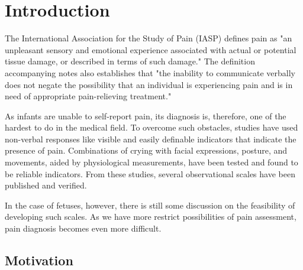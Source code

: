 \documentclass[msc]{ppgccufmg}
\begin{document}

\chapter{Introduction}

The International Association for the Study of Pain (IASP) defines pain as "an unpleasant sensory and emotional experience associated with actual or potential tissue damage, or described in terms of such damage." The definition accompanying notes also establishes that "the inability to communicate verbally does not negate the possibility that an individual is experiencing pain and is in need of appropriate pain-relieving treatment." \cite{merskey1994classification}

As infants are unable to self-report pain, its diagnosis is, therefore, one of the hardest to do in the medical field. To overcome such obstacles, studies have used non-verbal responses like visible and easily definable indicators that indicate the presence of pain. Combinations of crying with facial expressions, posture, and movements, aided by physiological measurements, have been tested and found to be reliable indicators. From these studies, several observational scales have been published and verified. 

In the case of fetuses, however, there is still some discussion on the feasibility of developing such scales. As we have more restrict possibilities of pain assessment, pain diagnosis becomes even more difficult.

\section{Motivation}
\end{document}
